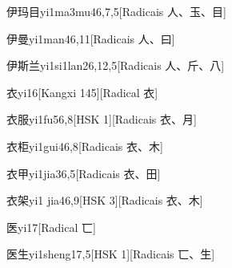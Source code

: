 \begin{entry}{伊玛目}{yi1ma3mu4}{6,7,5}[Radicais ⼈、⽟、⽬]
\end{entry}

\begin{entry}{伊曼}{yi1man4}{6,11}[Radicais ⼈、⽈]
\end{entry}

\begin{entry}{伊斯兰}{yi1si1lan2}{6,12,5}[Radicais ⼈、⽄、⼋]
\end{entry}

\begin{entry}{衣}{yi1}{6}[Kangxi 145][Radical ⾐]
\end{entry}

\begin{entry}{衣服}{yi1fu5}{6,8}[HSK 1][Radicais ⾐、⽉]
\end{entry}

\begin{entry}{衣柜}{yi1gui4}{6,8}[Radicais ⾐、⽊]
\end{entry}

\begin{entry}{衣甲}{yi1jia3}{6,5}[Radicais ⾐、⽥]
\end{entry}

\begin{entry}{衣架}{yi1 jia4}{6,9}[HSK 3][Radicais ⾐、⽊]
\end{entry}

\begin{entry}{医}{yi1}{7}[Radical ⼖]
\end{entry}

\begin{entry}{医生}{yi1sheng1}{7,5}[HSK 1][Radicais ⼖、⽣]
\end{entry}

